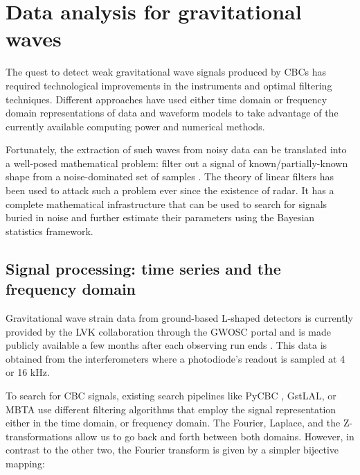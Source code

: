 \chapter{Data analysis for gravitational waves}\label{DA}

The quest to detect weak gravitational wave signals produced by CBCs has required technological improvements in the instruments and optimal filtering techniques. Different approaches have used either time domain or frequency domain representations of data and waveform models to take advantage of the currently available computing power and numerical methods.

Fortunately, the extraction of such waves from noisy data can be translated into a well-posed mathematical problem: filter out a signal of known/partially-known shape from a noise-dominated set of samples \cite{Maggiore:2007ulw, Creighton:2011zz, Sathyaprakash:2009xs}. The theory of linear filters has been used to attack such a problem ever since the existence of radar\cite{Wainstein:1962vrq}. It has a complete mathematical infrastructure that can be used to search for signals buried in noise and further estimate their parameters using the Bayesian statistics framework.



\section{Signal processing: time series and the frequency domain}

Gravitational wave strain data from ground-based L-shaped detectors is currently provided by the LVK collaboration through the GWOSC portal and is made publicly available a few months after each observing run ends \cite[section-3]{LIGOScientific:2019lzm}. This data is obtained from the interferometers where a photodiode's readout is sampled at 4 or 16 kHz.



To search for CBC signals, existing search pipelines like PyCBC \cite{Usman:2015kfa}, GstLAL\cite{Sachdev:2019vvd}, or MBTA\cite{Aubin:2020goo} use different filtering algorithms that employ the signal representation either in the time domain, or frequency domain. The Fourier, Laplace, and the Z-transformations allow us to go back and forth between both domains. However, in contrast to the other two, the Fourier transform is given by a simpler bijective mapping:

